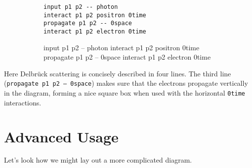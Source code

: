 \documentclass[12pt]{article}
\begin{document}
\begin{figure}[h!]\begin{subfigure}[h]{0.4\textwidth}\begin{center}
\begin{lstlisting}
input p1 p2 -- photon
interact p1 p2 positron 0time
propagate p1 p2 -- 0space
interact p1 p2 electron 0time
\end{lstlisting}
\end{center}\end{subfigure}\hfill\vrule\hfill\begin{subfigure}[h]{0.4\textwidth}\begin{center}
\begin{feynr}
input p1 p2 -- photon
interact p1 p2 positron 0time
propagate p1 p2 -- 0space
interact p1 p2 electron 0time
\end{feynr}
\end{center}\end{subfigure}\end{figure}
Here Delbr\"uck scattering is concisely described in four lines.
The third line (\texttt{propagate p1 p2 -- 0space}) makes sure that the electrons propagate vertically in the diagram, forming a nice square box when used with the horizontal \texttt{0time} interactions.

\newpage
\section*{Advanced Usage}
Let's look how we might lay out a more complicated diagram.
\end{document}
